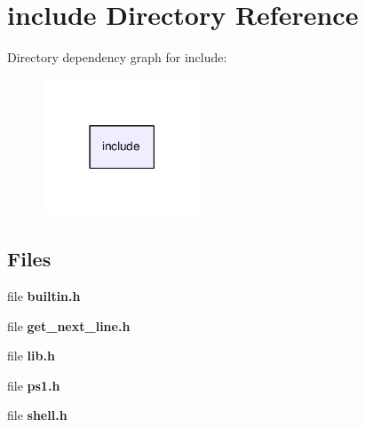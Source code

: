 \section{include Directory Reference}
\label{dir_d44c64559bbebec7f509842c48db8b23}
Directory dependency graph for include\-:\nopagebreak
\begin{figure}[H]
\begin{center}
\leavevmode
\includegraphics[width=134pt]{dir_d44c64559bbebec7f509842c48db8b23_dep}
\end{center}
\end{figure}
\subsection*{Files}
\begin{DoxyCompactItemize}
\item 
file {\bf builtin.\-h}
\item 
file {\bf get\-\_\-next\-\_\-line.\-h}
\item 
file {\bf lib.\-h}
\item 
file {\bf ps1.\-h}
\item 
file {\bf shell.\-h}
\end{DoxyCompactItemize}
